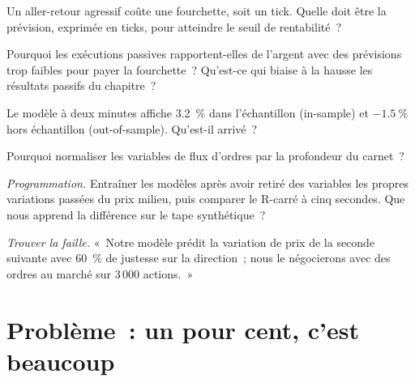 \begin{exercise}[$\star$]\label{exo:s1:intraday-machine-learned-alphas:3}
Un aller-retour agressif coûte une fourchette, soit un tick. Quelle doit être la prévision, exprimée en ticks, pour atteindre le seuil de rentabilité~?
\end{exercise}

\begin{exercise}[$\star\star$]\label{exo:s1:intraday-machine-learned-alphas:4}
Pourquoi les exécutions passives rapportent-elles de l'argent avec des prévisions trop faibles pour payer la fourchette~? Qu'est-ce qui biaise à la hausse les résultats passifs du chapitre~?
\end{exercise}

\begin{exercise}[$\star\star$]\label{exo:s1:intraday-machine-learned-alphas:5}
Le modèle à deux minutes affiche 3.2~\% dans l'échantillon (in-sample) et $-1.5~\%$ hors échantillon (out-of-sample). Qu'est-il arrivé~?
\end{exercise}

\begin{exercise}[$\star\star$]\label{exo:s1:intraday-machine-learned-alphas:6}
Pourquoi normaliser les variables de flux d'ordres par la profondeur du carnet~?
\end{exercise}

\begin{exercise}[$\star\star\star$]\label{exo:s1:intraday-machine-learned-alphas:7}
\emph{Programmation.} Entraîner les modèles après avoir retiré des variables les propres variations passées du prix milieu, puis comparer le R-carré à cinq secondes. Que nous apprend la
différence sur le tape synthétique~?
\end{exercise}

\begin{exercise}[$\star\star\star$]\label{exo:s1:intraday-machine-learned-alphas:8}
\emph{Trouver la faille.} «~Notre modèle prédit la variation de prix de la seconde suivante avec 60~\% de justesse sur la direction~; nous le négocierons avec des ordres au marché sur 3\,000
actions.~»
\end{exercise}

\section{Problème~: un pour cent, c'est beaucoup}

